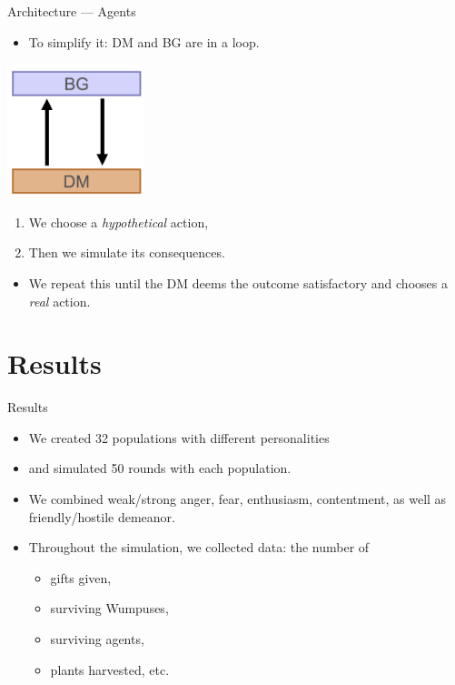 \documentclass{beamer}
\begin{document}
   \begin{frame}{Architecture --- Agents}
      \begin{itemize}
         \item To simplify it: DM and BG are in a loop.
      \end{itemize}
      
      \begin{center}
         \includegraphics[width=0.3\textwidth]{bg_dm_loop.png}
      \end{center}
      
      \begin{enumerate}
         \item We choose a \emph{hypothetical} action,
         \item Then we simulate its consequences.
      \end{enumerate}
      
      \begin{itemize}
         \item We repeat this until the DM deems the outcome satisfactory and chooses a \emph{real} action.
      \end{itemize}
   \end{frame}
   
   \section{Results}
   
   \begin{frame}{Results}
      \begin{itemize}
         \item We created 32 populations with different personalities
         \item and simulated 50 rounds with each population.
         \item We combined weak/strong anger, fear, enthusiasm, contentment, as well as friendly/hostile demeanor.
         \item Throughout the simulation, we collected data: the number of
         \begin{itemize}
            \item gifts given,
            \item surviving Wumpuses,
            \item surviving agents,
            \item plants harvested, etc.
         \end{itemize}
      \end{itemize}
   \end{frame}
   
\end{document}
